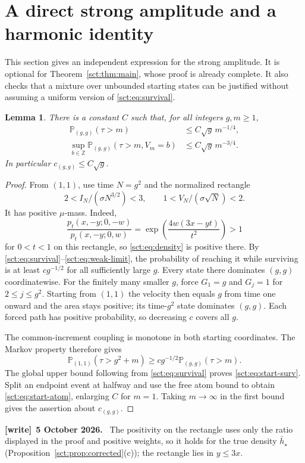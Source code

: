 \documentclass[11pt,letterpaper]{article}
\newtheorem{lemma}[theorem]{Lemma}
\theoremstyle{definition}\newtheorem{remark}[theorem]{Remark}
\newcommand{\Pp}{\mathbb P}\newcommand{\Ee}{\mathbb E}
\newcommand{\Z}{\mathbb Z}\newcommand{\R}{\mathbb R}\newcommand{\NN}{\mathbb N}
\newcommand{\hstar}{\bar h_\star}\newcommand{\fstar}{f_\star}\newcommand{\Kstar}{K_\star}
\newenvironment{writenote}[1][]{\par\smallskip\begingroup\small
 \noindent\textbf{[write]}\if\relax\detokenize{#1}\relax\else~\textbf{#1.}\fi\ }%
 {\par\endgroup\smallskip}
\begin{document}
\section{A direct strong amplitude and a harmonic identity}\label{sct:sec:harmonic}
This section gives an independent expression for the strong amplitude.
It is optional for Theorem~\ref{sct:thm:main}, whose proof is already complete.
It also checks that a mixture over unbounded starting states can be justified
without assuming a uniform version of \eqref{sct:eq:survival}.

\begin{lemma}\label{sct:lem:starts}
There is a constant $C$ such that, for all integers $g,m\ge1$,
\begin{align}
 \Pp_{(g,g)}(\tau>m)&\le C\sqrt g\,m^{-1/4},\label{sct:eq:start-surv}\\
 \sup_{b\in\Z}\Pp_{(g,g)}(\tau>m,V_m=b)
   &\le C\sqrt g\,m^{-3/4}.\label{sct:eq:start-atom}
\end{align}
In particular $c_{(g,g)}\le C\sqrt g$.
\end{lemma}
\begin{proof}
From $(1,1)$, use time $N=g^2$ and the normalized rectangle
\[
 2<I_N/(\sigma N^{3/2})<3,\qquad
 1<V_N/(\sigma\sqrt N)<2.
\]
It has positive $\mu$-mass. Indeed,
\[
 \frac{p_t(x,-y;0,-w)}{p_t(x,-y;0,w)}
   =\exp\left(\frac{4w(3x-yt)}{t^2}\right)>1
\]
for $0<t<1$ on this rectangle, so \eqref{sct:eq:density} is positive there.
By \eqref{sct:eq:survival}--\eqref{sct:eq:weak-limit}, the probability of reaching it
while surviving is at least $c g^{-1/2}$ for all sufficiently large $g$.
Every state there dominates $(g,g)$ coordinatewise. For the finitely many
smaller $g$, force $G_1=g$ and $G_j=1$ for $2\le j\le g^2$.
Starting from $(1,1)$ the velocity then equals $g$ from time one onward and
the area stays positive; its time-$g^2$ state dominates $(g,g)$.
Each forced path has positive probability, so decreasing $c$ covers all $g$.

The common-increment coupling is monotone in both starting coordinates.
The Markov property therefore gives
\[
 \Pp_{(1,1)}(\tau>g^2+m)
 \ge c g^{-1/2}\Pp_{(g,g)}(\tau>m).
\]
The global upper bound following from \eqref{sct:eq:survival} proves
\eqref{sct:eq:start-surv}. Split an endpoint event at halfway and use the free
atom bound to obtain \eqref{sct:eq:start-atom}, enlarging $C$ for $m=1$.
Taking $m\to\infty$ in the first bound gives the assertion about $c_{(g,g)}$.
\end{proof}
\begin{writenote}[5 October 2026]
The positivity on the rectangle uses only the ratio displayed in the proof and positive weights, so it holds for the true density $\hstar$ (Proposition~\ref{sct:prop:corrected}(c)); the rectangle lies in $y\le3x$.
\end{writenote}
\end{document}
